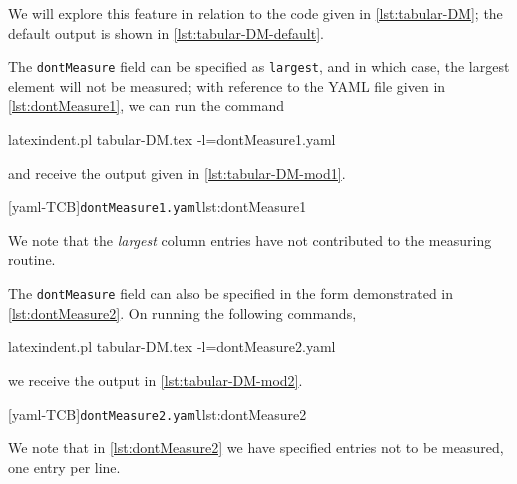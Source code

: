 \documentclass[10pt]{article}
\begin{document}
 \begin{example}
 We will explore this feature in relation to the code given in \cref{lst:tabular-DM}; the
 default output is shown in \cref{lst:tabular-DM-default}. %

 \begin{cmhtcbraster}[raster left skip=-1.5cm,]
 \end{cmhtcbraster}

 The \texttt{dontMeasure} field can be specified as \texttt{largest}, and in which case,
 the largest element will not be measured; with reference to the YAML file given in
 \cref{lst:dontMeasure1}, we can run the command 

 \begin{commandshell} 
latexindent.pl tabular-DM.tex -l=dontMeasure1.yaml
\end{commandshell}

 and receive the output given in \cref{lst:tabular-DM-mod1}.

 \begin{cmhtcbraster}
  [yaml-TCB]{\texttt{dontMeasure1.yaml}}{lst:dontMeasure1}
 \end{cmhtcbraster}

 We note that the \emph{largest} column entries have not contributed to the measuring
 routine.
 \end{example}

 \begin{example}
 The \texttt{dontMeasure} field can also be specified in the form demonstrated in
 \cref{lst:dontMeasure2}. On running the following commands, 

 \begin{commandshell} 
latexindent.pl tabular-DM.tex -l=dontMeasure2.yaml
\end{commandshell}

 we receive the output in \cref{lst:tabular-DM-mod2}. 

 \begin{cmhtcbraster}
  [yaml-TCB]{\texttt{dontMeasure2.yaml}}{lst:dontMeasure2}
 \end{cmhtcbraster}

 We note that in \cref{lst:dontMeasure2} we have specified entries not to be measured,
 one entry per line.
 \end{example}
\end{document}
